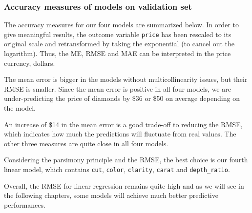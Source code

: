 \documentclass[
  paper=a4,
  ,captions=tableheading
]{scrartcl}
\begin{document}
\hypertarget{accuracy-measures-of-models-on-validation-set}{%
\subsubsection{Accuracy measures of models on validation
set}\label{accuracy-measures-of-models-on-validation-set}}

The accuracy measures for our four models are summarized below. In order
to give meaningful results, the outcome variable \texttt{price} has been
rescaled to its original scale and retransformed by taking the
exponential (to cancel out the logarithm). Thus, the ME, RMSE and MAE
can be interpreted in the price currency, dollars.

\begin{table}[!h]

\caption{\label{tab:models-accuracy-table}Accuracy measures of linear models}
\centering
{}
\end{table}

The mean error is bigger in the models without multicollinearity issues,
but their RMSE is smaller. Since the mean error is positive in all four
models, we are under-predicting the price of diamonds by \$36 or \$50 on
average depending on the model.

An increase of \$14 in the mean error is a good trade-off to reducing
the RMSE, which indicates how much the predictions will fluctuate from
real values. The other three measures are quite close in all four
models.

Considering the parsimony principle and the RMSE, the best choice is our
fourth linear model, which contains \texttt{cut}, \texttt{color},
\texttt{clarity}, \texttt{carat} and \texttt{depth\_ratio}.

Overall, the RMSE for linear regression remains quite high and as we
will see in the following chapters, some models will achieve much better
predictive performances.
\end{document}
